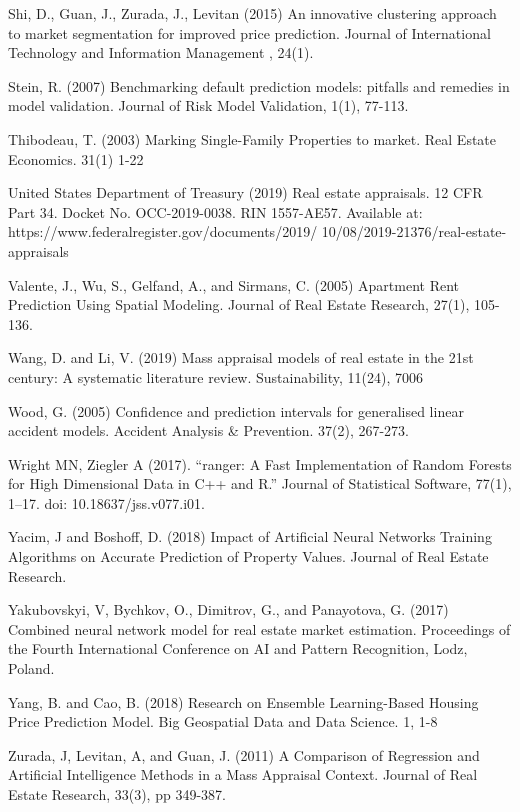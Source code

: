 \documentclass[colTwo]{anon}
\theoremstyle{definition}
\begin{document}
\begin{thebibliography}{50}
\harvarditem{}{}{}Shi, D., Guan, J., Zurada, J., Levitan (2015) An innovative clustering approach to market segmentation for improved price prediction. Journal of International Technology and Information Management , 24(1).  

\harvarditem{}{}{}Stein, R. (2007) Benchmarking default prediction models: pitfalls and remedies in model validation. Journal of Risk Model Validation, 1(1), 77-113. 

\harvarditem{}{}{}Thibodeau, T. (2003) Marking Single-Family Properties to market. Real Estate Economics. 31(1) 1-22

\harvarditem{}{}{}United States Department of Treasury (2019) Real estate appraisals. 12 CFR Part 34. Docket No. OCC-2019-0038. RIN 1557-AE57. Available at: https://www.federalregister.gov/documents/2019/ 10/08/2019-21376/real-estate-appraisals

\harvarditem{}{}{}Valente, J., Wu, S., Gelfand, A., and Sirmans, C. (2005) Apartment Rent Prediction Using Spatial Modeling. Journal of Real Estate Research, 27(1), 105-136. 

\harvarditem{}{}{}Wang, D. and Li, V. (2019) Mass appraisal models of real estate in the 21st century: A systematic literature review.  Sustainability, 11(24), 7006

\harvarditem{}{}{}Wood, G. (2005) Confidence and prediction intervals for generalised linear accident models. Accident Analysis \& Prevention. 37(2), 267-273. 

\harvarditem{}{}{}Wright MN, Ziegler A (2017). “ranger: A Fast Implementation of Random Forests for High Dimensional Data in C++ and R.” Journal of Statistical Software, 77(1), 1–17. doi: 10.18637/jss.v077.i01.

\harvarditem{}{}{}Yacim, J and Boshoff, D. (2018) Impact of Artificial Neural Networks Training Algorithms on Accurate Prediction of Property Values. Journal of Real Estate Research. 

\harvarditem{}{}{}Yakubovskyi, V, Bychkov, O., Dimitrov, G., and Panayotova, G.  (2017) Combined neural network model for real estate market estimation. Proceedings of the Fourth International Conference on AI and Pattern Recognition, Lodz, Poland.  

\harvarditem{}{}{}Yang, B. and Cao, B. (2018) Research on Ensemble Learning-Based Housing Price Prediction Model. Big Geospatial Data and Data Science. 1, 1-8

\harvarditem{}{}{}Zurada, J, Levitan, A, and Guan, J. (2011) A Comparison of Regression and Artificial Intelligence Methods in a Mass Appraisal Context. Journal of Real Estate Research, 33(3), pp 349-387. 

\end{thebibliography}
\end{document}
